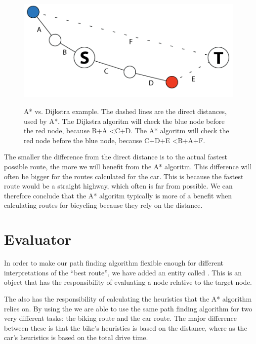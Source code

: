 \begin{figure}[!ht]
\centering
\includegraphics[width=1\linewidth]{images/AstarVSDijkstra.png}
\label{}
\caption{A* vs. Dijkstra example. The dashed lines are the direct distances,
used by A*. The Dijkstra algoritm will check the blue node before the red
node, because B+A \textless C+D. The A* algoritm will check the red node
before the blue node, because C+D+E \textless B+A+F.}
\end{figure}

The smaller the difference from the direct distance is to the actual fastest
possible route, the more we will benefit from the A* algoritm. This
difference will often be bigger for the routes calculated for the car. This is
because the fastest route would be a straight highway, which often is far from
possible. We can therefore conclude that the A* algoritm typically is more
of a benefit when calculating routes for bicycling because they rely on the
distance.

\section{Evaluator}
\label{IMPL-EVA}
In order to make our path finding algorithm flexible enough for different 
interpretations of the ``best route'', we have added an entity called . 
This is an object that has the responsibility of evaluating a node relative to 
the target node. 

The  also has the responsibility of calculating the 
heuristics that the A* algorithm relies on. By using the  we are able to 
use the same path finding algorithm for two very different tasks; the biking route and 
the car route. The major difference between these is that the bike's heuristics is based 
on the distance, where as the car's heuristics is based on the total drive time. 

